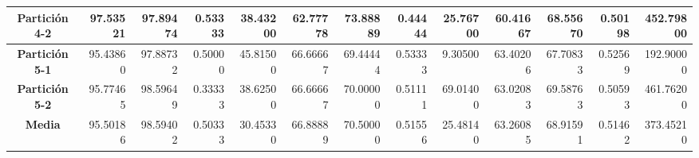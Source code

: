 \documentclass[a4paper,11pt]{article}
\begin{document}
\begin{table}[H]
\begin{adjustbox}{width=1.1\textwidth}
\begin{tabular}{|c|r|r|r|r|r|r|r|r|r|r|r|r|}
    \textbf{Partición 4-2} & 97.53521 & 97.89474 & 0.53333 & 38.43200 & 62.77778 & 73.88889 & 0.44444 & 25.76700 & 60.41667 & 68.55670 & 0.50198 & 452.79800 \\ \hline
    \textbf{Partición 5-1} & 95.43860 & 97.88732 & 0.50000 & 45.81500 & 66.66667 & 69.44444 & 0.53333 & 9.30500 & 63.40206 & 67.70833 & 0.52569 & 192.90000 \\ \hline
    \textbf{Partición 5-2} & 95.77465 & 98.59649 & 0.33333 & 38.62500 & 66.66667 & 70.00000 & 0.51111 & 69.01400 & 63.02083 & 69.58763 & 0.50593 & 461.76200 \\ \hline
    \textbf{Media} & 95.50186 & 98.59402 & 0.50333 & 30.45330 & 66.88889 & 70.50000 & 0.51556 & 25.48140 & 63.26085 & 68.91591 & 0.51462 & 373.45210 \\ \hline
    \end{tabular}
    \end{adjustbox}
    \label{ES}
  \end{table}  
\end{document}
